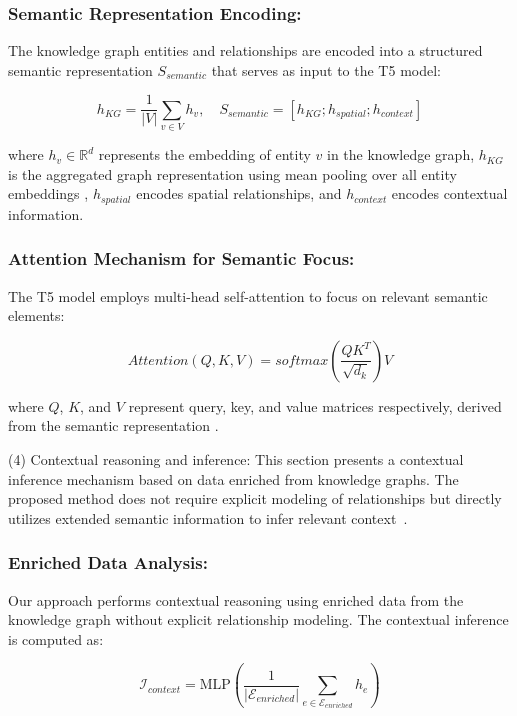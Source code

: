 \documentclass[runningheads,14pt]{llncs}
\begin{document}
\subsubsection{Semantic Representation Encoding:}
The knowledge graph entities and relationships are encoded into a structured semantic representation $S_{semantic}$ that serves as input to the T5 model:

\begin{equation}
h_{KG} = \frac{1}{|V|} \sum_{v \in V} h_v, \quad S_{semantic} = [h_{KG}; h_{spatial}; h_{context}]
\end{equation}

where $h_v \in \mathbb{R}^d$ represents the embedding of entity $v$ in the knowledge graph, $h_{KG}$ is the aggregated graph representation using mean pooling over all entity embeddings \cite{kipf2017semi}, $h_{spatial}$ encodes spatial relationships, and $h_{context}$ encodes contextual information.

\subsubsection{Attention Mechanism for Semantic Focus:}
The T5 model employs multi-head self-attention to focus on relevant semantic elements:

\begin{equation}
Attention(Q, K, V) = softmax\left(\frac{QK^T}{\sqrt{d_k}}\right)V
\end{equation}

where $Q$, $K$, and $V$ represent query, key, and value matrices respectively, derived from the semantic representation \cite{vaswani2017attention}.


(4) Contextual reasoning and inference:  This section presents a contextual inference mechanism based on data enriched from knowledge graphs. 
The proposed method does not require explicit modeling of relationships but directly utilizes extended semantic information to infer relevant context~\cite{zhao2021knowledge}. 

\subsubsection{Enriched Data Analysis:}
Our approach performs contextual reasoning using enriched data from the knowledge graph without explicit relationship modeling. The contextual inference is computed as:

\begin{equation}
\mathcal{I}_{context} = \text{MLP}\left(\frac{1}{|\mathcal{E}_{enriched}|} \sum_{e \in \mathcal{E}_{enriched}} h_e\right)
\end{equation}
\end{document}
